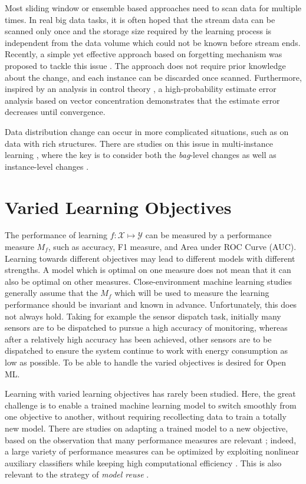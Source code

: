 \documentclass[review,11pt]{ReportTemplate}
\begin{document}
Most sliding window or ensemble based approaches need to scan data for multiple times. In real big data tasks, it is often hoped that the stream data can be scanned only once and the storage size required by the learning process is independent from the data volume which could not be known before stream ends. Recently, a simple yet effective approach based on forgetting mechanism was proposed to tackle this issue \cite{Zhao:Wang:Xie:Guo:Zhou2021}. The approach does not require prior knowledge about the change, and each instance can be discarded once scanned. Furthermore, inspired by an analysis in control theory \cite{Guo:Ljung:Priouret1993}, a high-probability estimate error analysis based on vector concentration demonstrates that the estimate error decreases until convergence.

Data distribution change can occur in more complicated situations, such as on data with rich structures. There are studies on this issue in multi-instance learning \cite{Foulds:Frank2010}, where the key is to consider both the \textit{bag}-level changes as well as instance-level changes \cite{Zhang:Zhou2017}.


\section{Varied Learning Objectives}

The performance of learning $f: \mathcal{X} \mapsto \mathcal{Y}$ can be measured by a performance measure $M_f$, such as accuracy, F1 measure, and Area under ROC Curve (AUC). Learning towards different objectives may lead to different models with different strengths. A model which is optimal on one measure does not mean that it can also be optimal on other measures. Close-environment machine learning studies generally assume that the $M_f$ which will be used to measure the learning performance should be invariant and known in advance. Unfortunately, this does not always hold. Taking for example the sensor dispatch task, initially many sensors are to be dispatched to pursue a high accuracy of monitoring, whereas after a relatively high accuracy has been achieved, other sensors are to be dispatched to ensure the system continue to work with energy consumption as low as possible. To be able to handle the varied objectives is desired for Open ML.

Learning with varied learning objectives has rarely been studied. Here, the great challenge is to enable a trained machine learning model to switch smoothly from one objective to another, without requiring recollecting data to train a totally new model. There are studies on adapting a trained model to a new objective, based on the observation that many performance measures are relevant \cite{Cortes:Mohri2004,Wu:Zhou2017}; indeed, a large variety of performance measures can be optimized by exploiting nonlinear auxiliary classifiers while keeping high computational efficiency \cite{Li:Tsang:Zhou2013}. This is also relevant to the strategy of \textit{model reuse} \cite{Zhao:Cai:Zhou2020,Wu:Liu:Zhou2019}.
\end{document}
